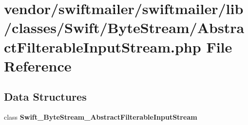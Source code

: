\section{vendor/swiftmailer/swiftmailer/lib/classes/\+Swift/\+Byte\+Stream/\+Abstract\+Filterable\+Input\+Stream.php File Reference}
\label{_abstract_filterable_input_stream_8php}
\subsection*{Data Structures}
\begin{DoxyCompactItemize}
\item 
class {\bf Swift\+\_\+\+Byte\+Stream\+\_\+\+Abstract\+Filterable\+Input\+Stream}
\end{DoxyCompactItemize}
